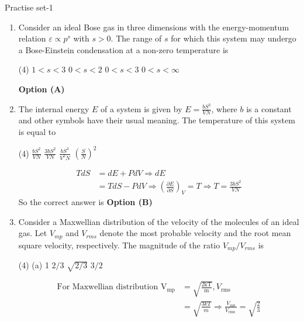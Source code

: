 \begin{abox}
	Practise set-1
\end{abox}
\begin{enumerate}
	\item Consider an ideal Bose gas in three dimensions with the energy-momentum relation $\varepsilon \propto p^{s}$ with $s>0$. The range of $s$ for which this system may undergo a Bose-Einstein condensation at a non-zero temperature is
{}
\begin{tasks}(4)
\task[\textbf{A.}] $1<s<3$
\task[\textbf{B.}] $0<s<2$
\task[\textbf{C.}] $0<s<3$
\task[\textbf{D.}] $0<s<\infty$
\end{tasks}
\begin{answer}
 \textbf{Option (A)}
\end{answer}
\item The internal energy $E$ of a system is given by $E=\frac{b S^{3}}{V N}$, where $b$ is a constant and other symbols have their usual meaning. The temperature of this system is equal to
{}
\begin{tasks}(4)
\task[\textbf{A.}] $\frac{b S^{2}}{V N}$
\task[\textbf{B.}] $\frac{3 b S^{2}}{V N}$
\task[\textbf{C.}]  $\frac{b S^{3}}{V^{2} N}$
\task[\textbf{D.}] $\left(\frac{S}{N}\right)^{2}$
\end{tasks}
\begin{answer}
\begin{align*}
T d S&=d E+P d V \Rightarrow d E\\&=T d S-P d V \Rightarrow\left(\frac{\partial E}{\partial S}\right)_{V}=T \Rightarrow T=\frac{3 b S^{2}}{V N}
\end{align*}
So the correct answer is \textbf{Option (B)}
\end{answer}
\item Consider a Maxwellian distribution of the velocity of the molecules of an ideal gas. Let $V_{m p}$ and $V_{r m s}$ denote the most probable velocity and the root mean square velocity, respectively. The magnitude of the ratio $V_{m p} / V_{r m s}$ is
{}
\begin{tasks}(4)
\task[\textbf{A.}] (a) 1
\task[\textbf{B.}] $2 / 3$
\task[\textbf{C.}] $\sqrt{2 / 3}$
\task[\textbf{D.}] $3 / 2$
\end{tasks}
\begin{answer}
\begin{align*}
\text{For Maxwellian distribution }\mathrm{V}_{\mathrm{mp}}&=\sqrt{\frac{2 \mathrm{kT}}{\mathrm{m}}}, V_{\text {rms }}\\&=\sqrt{\frac{3 k T}{m}} \Rightarrow \frac{V_{m b}}{V_{\text {rms }}}=\sqrt{\frac{2}{3}}

\end{align*}
\end{answer}
\end{enumerate}
